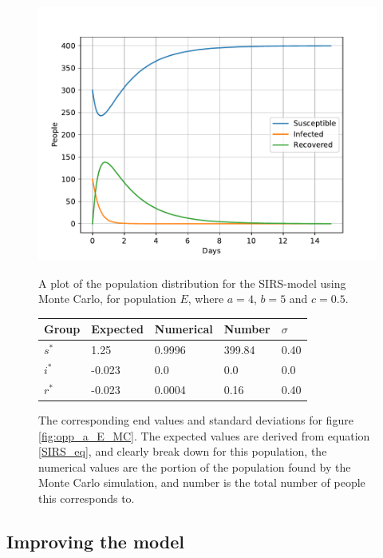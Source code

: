 \documentclass[a4paper]{article}
\let\Oldsubsection\subsection
\renewcommand{\subsection}{\FloatBarrier\Oldsubsection}
\begin{document}
	\begin{figure}[!htb]
		\centering
		\begin{minipage}{0.49\textwidth}
			\centering
			\includegraphics[scale=0.6]{../plots/opp_a_E_MC.pdf}
			\caption{A plot of the population distribution for the SIRS-model using Monte Carlo, for population $E$, where $a=4$, $b=5$ and $c=0.5$. }\label{fig:opp_a_E_MC}
		\end{minipage}
		\begin{minipage}{0.49\textwidth}
			\centering
			\captionsetup{type=table} %
			\begin{tabular}{|l|l|l|l|l|}
				\hline
				Group & Expected & Numerical   & Number  & $\sigma$\\ \hline
				$s^*$ & 1.25 & 0.9996 & 399.84 & 0.40\\ \hline
				$i^*$ & -0.023 & 0.0 & 0.0 & 0.0\\ \hline
				$r^*$ & -0.023 & 0.0004 & 0.16 & 0.40\\ \hline
			\end{tabular}
			\caption{The corresponding end values and standard deviations for figure \ref{fig:opp_a_E_MC}. The expected values are derived from equation \ref{SIRS_eq}, and clearly break down for this population, the numerical values are the portion of the population found by the Monte Carlo simulation, and number is the total number of people this corresponds to.}\label{tab:opp_a_E_mc}
		\end{minipage}
	\end{figure}
	
	
	\subsection{Improving the model}
	
\end{document}
